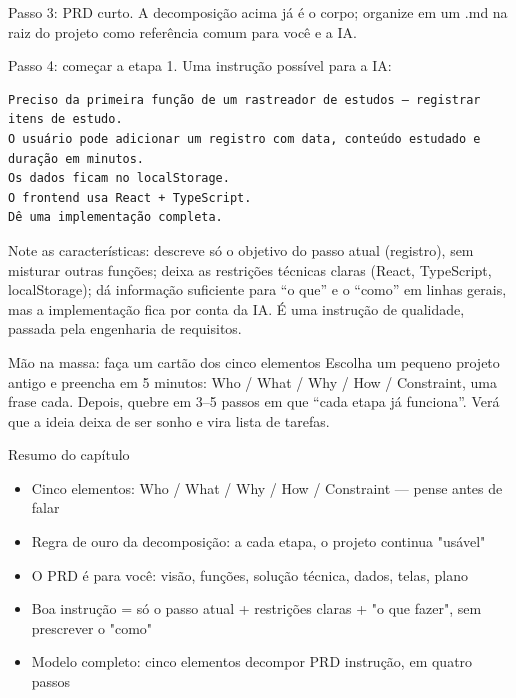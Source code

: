 Passo 3: PRD curto. A decomposição acima já é o corpo; organize em um .md na raiz do projeto como referência comum para você e a IA.

Passo 4: começar a etapa 1. Uma instrução possível para a IA:

\begin{lstlisting}
Preciso da primeira função de um rastreador de estudos — registrar itens de estudo.
O usuário pode adicionar um registro com data, conteúdo estudado e duração em minutos.
Os dados ficam no localStorage.
O frontend usa React + TypeScript.
Dê uma implementação completa.
\end{lstlisting}

Note as características: descreve só o objetivo do passo atual (registro), sem misturar outras funções; deixa as restrições técnicas claras (React, TypeScript, localStorage); dá informação suficiente para “o que” e o “como” em linhas gerais, mas a implementação fica por conta da IA. É uma instrução de qualidade, passada pela engenharia de requisitos.

\begin{tcbpractice}{Mão na massa: faça um cartão dos cinco elementos}
Escolha um pequeno projeto antigo e preencha em 5 minutos: Who / What / Why / How / Constraint, uma frase cada. Depois, quebre em 3–5 passos em que “cada etapa já funciona”. Verá que a ideia deixa de ser sonho e vira lista de tarefas.

\end{tcbpractice}

\begin{tcbsummary}{Resumo do capítulo}
\begin{itemize}
  \item Cinco elementos: Who / What / Why / How / Constraint — pense antes de falar
  \item Regra de ouro da decomposição: a cada etapa, o projeto continua "usável"
  \item O PRD é para você: visão, funções, solução técnica, dados, telas, plano
  \item Boa instrução = só o passo atual + restrições claras + "o que fazer", sem prescrever o "como"
  \item Modelo completo: cinco elementos decompor PRD instrução, em quatro passos
\end{itemize}

\end{tcbsummary}
